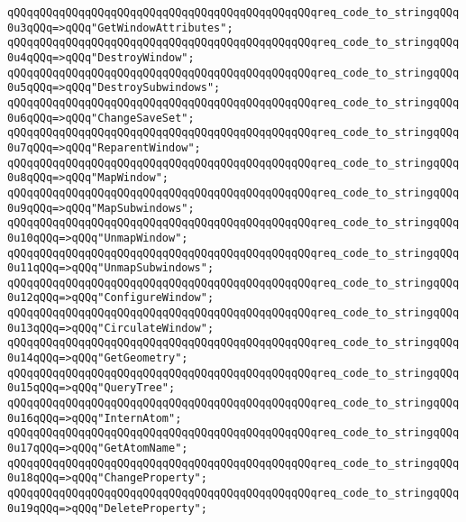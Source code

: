 \verb|qQQqqQQqqQQqqQQqqQQqqQQqqQQqqQQqqQQqqQQqqQQqqQQqreq_code_to_stringqQQq0u3qQQq=>qQQq"GetWindowAttributes";|\newline
\verb|qQQqqQQqqQQqqQQqqQQqqQQqqQQqqQQqqQQqqQQqqQQqqQQqreq_code_to_stringqQQq0u4qQQq=>qQQq"DestroyWindow";|\newline
\verb|qQQqqQQqqQQqqQQqqQQqqQQqqQQqqQQqqQQqqQQqqQQqqQQqreq_code_to_stringqQQq0u5qQQq=>qQQq"DestroySubwindows";|\newline
\verb|qQQqqQQqqQQqqQQqqQQqqQQqqQQqqQQqqQQqqQQqqQQqqQQqreq_code_to_stringqQQq0u6qQQq=>qQQq"ChangeSaveSet";|\newline
\verb|qQQqqQQqqQQqqQQqqQQqqQQqqQQqqQQqqQQqqQQqqQQqqQQqreq_code_to_stringqQQq0u7qQQq=>qQQq"ReparentWindow";|\newline
\verb|qQQqqQQqqQQqqQQqqQQqqQQqqQQqqQQqqQQqqQQqqQQqqQQqreq_code_to_stringqQQq0u8qQQq=>qQQq"MapWindow";|\newline
\verb|qQQqqQQqqQQqqQQqqQQqqQQqqQQqqQQqqQQqqQQqqQQqqQQqreq_code_to_stringqQQq0u9qQQq=>qQQq"MapSubwindows";|\newline
\verb|qQQqqQQqqQQqqQQqqQQqqQQqqQQqqQQqqQQqqQQqqQQqqQQqreq_code_to_stringqQQq0u10qQQq=>qQQq"UnmapWindow";|\newline
\verb|qQQqqQQqqQQqqQQqqQQqqQQqqQQqqQQqqQQqqQQqqQQqqQQqreq_code_to_stringqQQq0u11qQQq=>qQQq"UnmapSubwindows";|\newline
\verb|qQQqqQQqqQQqqQQqqQQqqQQqqQQqqQQqqQQqqQQqqQQqqQQqreq_code_to_stringqQQq0u12qQQq=>qQQq"ConfigureWindow";|\newline
\verb|qQQqqQQqqQQqqQQqqQQqqQQqqQQqqQQqqQQqqQQqqQQqqQQqreq_code_to_stringqQQq0u13qQQq=>qQQq"CirculateWindow";|\newline
\verb|qQQqqQQqqQQqqQQqqQQqqQQqqQQqqQQqqQQqqQQqqQQqqQQqreq_code_to_stringqQQq0u14qQQq=>qQQq"GetGeometry";|\newline
\verb|qQQqqQQqqQQqqQQqqQQqqQQqqQQqqQQqqQQqqQQqqQQqqQQqreq_code_to_stringqQQq0u15qQQq=>qQQq"QueryTree";|\newline
\verb|qQQqqQQqqQQqqQQqqQQqqQQqqQQqqQQqqQQqqQQqqQQqqQQqreq_code_to_stringqQQq0u16qQQq=>qQQq"InternAtom";|\newline
\verb|qQQqqQQqqQQqqQQqqQQqqQQqqQQqqQQqqQQqqQQqqQQqqQQqreq_code_to_stringqQQq0u17qQQq=>qQQq"GetAtomName";|\newline
\verb|qQQqqQQqqQQqqQQqqQQqqQQqqQQqqQQqqQQqqQQqqQQqqQQqreq_code_to_stringqQQq0u18qQQq=>qQQq"ChangeProperty";|\newline
\verb|qQQqqQQqqQQqqQQqqQQqqQQqqQQqqQQqqQQqqQQqqQQqqQQqreq_code_to_stringqQQq0u19qQQq=>qQQq"DeleteProperty";|\newline
